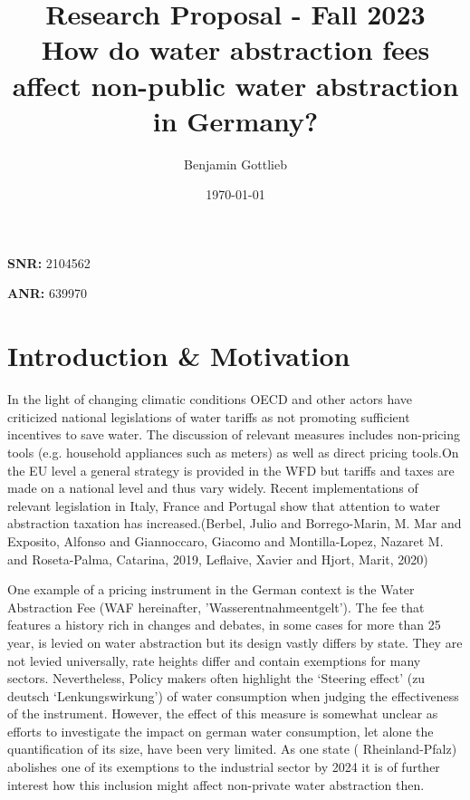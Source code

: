 \documentclass[11pt]{article}
\author{Benjamin Gottlieb}
\date{\today}
\title{Research Proposal - Fall 2023\\\medskip
\large How do water abstraction fees affect non-public water abstraction in Germany?}
\begin{document}
\maketitle
\vspace{10mm}

\textbf{SNR:} 2104562

\textbf{ANR:} 639970

\vspace{10mm}

\newpage

\setcounter{tocdepth}{2}
\tableofcontents

\newpage

\section{Introduction \&  Motivation}
\label{sec:orgcda3d74}
\label{sec:intro & motivation}

In the light of changing climatic conditions OECD and other actors have criticized national legislations of water tariffs as not promoting sufficient incentives to save water. The discussion of relevant measures includes non-pricing tools (e.g. household appliances such as meters) as well as direct pricing tools.On the EU level a general strategy is provided in the WFD but tariffs and taxes are made on a national level and thus vary widely. Recent implementations of relevant legislation in Italy, France and Portugal show that attention to water abstraction taxation has increased.(Berbel, Julio and Borrego-Marin, M. Mar and Exposito, Alfonso and Giannoccaro, Giacomo and Montilla-Lopez, Nazaret M. and Roseta-Palma, Catarina, 2019,  Leflaive, Xavier and Hjort, Marit, 2020)

One example of a pricing instrument in the German context is the Water Abstraction Fee (WAF hereinafter, 'Wasserentnahmeentgelt'). The fee that features a history rich in changes and debates, in some cases for more than 25 year, is levied on water abstraction but its design vastly differs by state. They are not levied universally, rate heights differ and contain exemptions for many sectors. Nevertheless, Policy makers often highlight the ‘Steering effect’ 
(zu deutsch ‘Lenkungswirkung’) of water consumption when judging the effectiveness of the instrument. However, the effect of this measure is somewhat unclear as efforts to investigate the impact on german water consumption, let alone the quantification of its size, have been very limited. As one state ( Rheinland-Pfalz) abolishes one of its exemptions to the industrial sector by 2024 it is of further interest how this inclusion might affect non-private water abstraction then.
\end{document}
